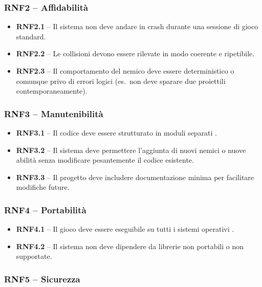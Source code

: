 \documentclass[12pt,a4paper]{article}
\newcommand{\req}[2]{%
  \noindent\textbf{#1} -- #2\par\smallskip
}
\begin{document}
\begin{small}
\subsubsection{RNF2 – Affidabilità}

\begin{itemize}[leftmargin=2em]
  \item \req{RNF2.1}{Il sistema non deve andare in crash durante una sessione di gioco standard.}
  \item \req{RNF2.2}{Le collisioni devono essere rilevate in modo coerente e ripetibile.}
  \item \req{RNF2.3}{Il comportamento del nemico deve essere deterministico o comunque privo di
    errori logici (es.\ non deve sparare due proiettili contemporaneamente).}
\end{itemize}

\subsubsection{RNF3 – Manutenibilità}
\begin{itemize}[leftmargin=2em]
  \item \req{RNF3.1}{Il codice deve essere strutturato in moduli separati .}
  \item \req{RNF3.2}{Il sistema deve permettere l'aggiunta di nuovi nemici o nuove abilità senza
    modificare pesantemente il codice esistente.}
  \item \req{RNF3.3}{Il progetto deve includere documentazione minima per facilitare modifiche
    future.}
\end{itemize}

\subsubsection{RNF4 – Portabilità}

\begin{itemize}[leftmargin=2em]
  \item \req{RNF4.1}{Il gioco deve essere eseguibile su tutti i sistemi operativi .}
  \item \req{RNF4.2}{Il sistema non deve dipendere da librerie non portabili o non supportate.}
\end{itemize}

\subsubsection{RNF5 – Sicurezza}


\end{small}
\end{document}
